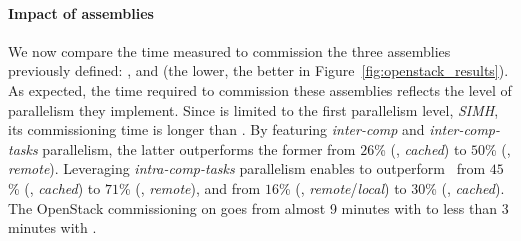 \paragraph{Impact of assemblies}

We now compare the time measured to commission the three assemblies
previously defined: \ansass, \aeoass and \madass (the lower, the
better in Figure~\ref{fig:openstack_results}).  As expected, the time
required to commission these assemblies reflects the level of
parallelism they implement. Since \ansass is limited to the first
parallelism level, \ie \emph{SIMH}, its commissioning time is longer
than \aeoass. By featuring \emph{inter-comp} and
\emph{inter-comp-tasks} parallelism, the latter outperforms the former
from $26$\% (\nova, \emph{cached}) to $50$\% (\ecotype,
\emph{remote}). Leveraging \emph{intra-comp-tasks} parallelism enables
\madass to outperform \ansass~from $45$\% (\nova, \emph{cached}) to
$71$\% (\ecotype, \emph{remote}), and \aeoass from $16$\% (\nova,
\emph{remote}/\emph{local}) to $30$\% (\ecotype, \emph{cached}).
The OpenStack commissioning on \ecotype goes from
almost 9 minutes with \ansass to less than 3 minutes with \madass.
%

